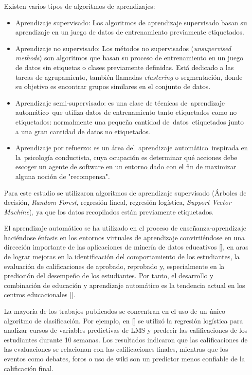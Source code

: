 Existen varios tipos de algoritmos de aprendizajes: 
\begin{itemize}
    \item Aprendizaje supervisado: Los algoritmos de aprendizaje supervisado basan su aprendizaje en un juego de datos de entrenamiento previamente etiquetados.
    \item Aprendizaje no supervisado: Los métodos no supervisados (\textit{unsupervised methods}) son algoritmos que basan su proceso de entrenamiento en un juego de datos sin etiquetas o clases previamente deﬁnidas. Está dedicado a las tareas de agrupamiento, también llamadas \textit{clustering} o segmentación, donde su objetivo es encontrar grupos similares en el conjunto de datos.
    \item Aprendizaje semi-supervisado: es una clase de técnicas de aprendizaje automático que utiliza datos de entrenamiento tanto etiquetados como no etiquetados: normalmente una pequeña cantidad de datos etiquetados junto a una gran cantidad de datos no etiquetados.
    \item Aprendizaje por refuerzo: es un área del aprendizaje automático inspirada en la psicología conductista, cuya ocupación es determinar qué acciones debe escoger un agente de software en un entorno dado con el fin de maximizar alguna noción de "recompensa".
\end{itemize}

Para este estudio se utilizaron algoritmos de aprendizaje supervisado (Árboles de decisión, \textit{Random Forest}, regresión lineal, regresión logística, \textit{Support Vector Machine}), ya que los datos recopilados están previamente etiquetados.  


El aprendizaje automático se ha utilizado en el proceso de enseñanza-aprendizaje haciéndose énfasis en los entornos virtuales de aprendizaje convirtiéndose en una dirección importante de las aplicaciones de minería de datos educativos [\cite{murad2018recommendation}], en aras de lograr mejoras en la identificación del comportamiento de los estudiantes, la evaluación de calificaciones de aprobado, reprobado y, especialmente en la predicción del desempeño de los estudiantes. Por tanto, el desarrollo y combinación de educación y aprendizaje automático es la tendencia actual en los centros educacionales [\cite{Suleiman}].  



La mayoría de los trabajos publicados se concentran en el uso de un único algoritmo de clasificación. Por ejemplo, en [\cite{conijn2016predicting}] se utilizó la regresión logística para analizar cursos de variables predictivas  de LMS y predecir las calificaciones de los estudiantes durante 10 semanas. Los resultados indicaron que las calificaciones de las evaluaciones se relacionan con las calificaciones finales, mientras que los eventos como debates, foros o uso de wiki son un predictor menos confiable de la calificación final.


